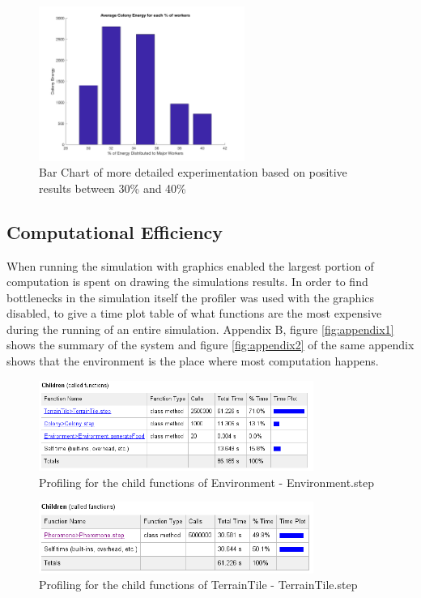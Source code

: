 \begin{figure}[H]
  \centering
  \includegraphics[width=0.6\textwidth]{images/bar-chart-detail.png}
  \caption{Bar Chart of more detailed experimentation based on positive results between 30\% and 40\%}
  \label{fig:bar-chart-detail}
\end{figure}
 
\subsection{Computational Efficiency}

When running the simulation with graphics enabled the largest portion of computation is spent on drawing the simulations results. In order to find bottlenecks in the simulation itself the profiler was used with the graphics disabled, to give a time plot table of what functions are the most expensive during the running of an entire simulation. Appendix B, figure \ref{fig:appendix1} shows the summary of the system and figure \ref{fig:appendix2} of the same appendix shows that the environment is the place where most computation happens.\par

 \begin{figure}[htb]
  \centering
  \includegraphics[width=0.8\textwidth]{images/text1.png}
  \caption{Profiling for the child functions of Environment - Environment.step}
  \label{fig:text1}
\end{figure}

 \begin{figure}[htb]
  \centering
  \includegraphics[width=0.8\textwidth]{images/text2.png}
  \caption{Profiling for the child functions of TerrainTile - TerrainTile.step}
  \label{fig:text2}
\end{figure}

